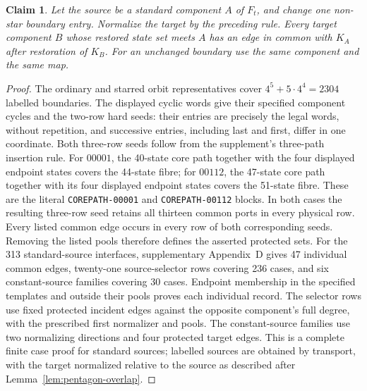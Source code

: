 \documentclass[11pt]{article}
\newtheorem{claim}{Claim}
\theoremstyle{remark}
\numberwithin{equation}{section}
\numberwithin{table}{section}
\begin{document}
\begin{claim}\label{lem:pentagon-protection}
Let the source be a standard component $A$ of $F_t$, and change one
non-star boundary entry. Normalize the target by the preceding rule.
Every target component $B$ whose restored state set meets $A$ has an
edge in common with $K_A$ after restoration of $K_B$.
For an unchanged boundary use the same component and the same map.
\end{claim}
\begin{proof}
The ordinary and starred orbit representatives cover
$4^5+5\cdot4^4=2304$ labelled boundaries. The displayed cyclic words
give their specified component cycles and the two-row hard seeds:
their entries are precisely the legal words, without repetition,
and successive entries, including last and first, differ in one
coordinate. Both three-row seeds follow from the supplement's
three-path insertion rule. For $00001$, the 40-state core path together
with the four displayed endpoint states covers the 44-state fibre; for
$00112$, the 47-state core path together with its four displayed endpoint
states covers the 51-state fibre. These are the literal
\texttt{COREPATH-00001} and \texttt{COREPATH-00112} blocks. In both cases
the resulting three-row seed retains all thirteen common ports in every
physical row. Every listed common edge occurs in
every row of both corresponding seeds.
Removing the listed pools therefore defines the asserted protected sets.
For the 313 standard-source interfaces, supplementary Appendix~D gives 47
individual common edges, twenty-one source-selector rows covering 236
cases, and six constant-source families covering 30 cases.
Endpoint membership in the specified templates and outside their pools
proves each individual record. The selector rows use fixed protected
incident edges against the opposite component's full degree, with the
prescribed first normalizer and pools. The constant-source families use
two normalizing directions and four protected target edges. This is a
complete finite case proof for standard sources; labelled sources are
obtained by transport, with the target normalized relative to the source
as described after Lemma~\ref{lem:pentagon-overlap}.
\end{proof}
\end{document}
